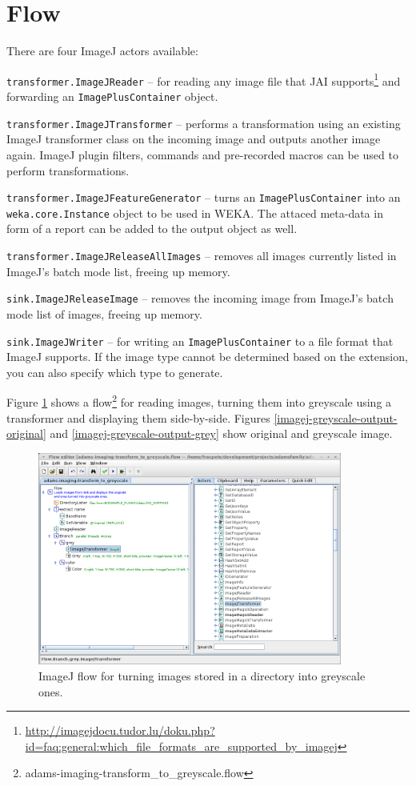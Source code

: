 \documentclass[a4paper]{book}
\begin{document}
\section{Flow}
There are four ImageJ actors available:
\begin{tight_itemize}
	\item \texttt{transformer.ImageJReader} -- for reading any image file that
	JAI supports\footnote{\url{http://imagejdocu.tudor.lu/doku.php?id=faq:general:which_file_formats_are_supported_by_imagej}{}}
	and forwarding an \texttt{ImagePlusContainer} object.
	\item \texttt{transformer.ImageJTransformer} -- performs a transformation
	using an existing ImageJ transformer class on the incoming image and
	outputs another image again. ImageJ plugin filters, commands and pre-recorded
	macros can be used to perform transformations.
	\item \texttt{transformer.ImageJFeatureGenerator} -- turns an
	\texttt{ImagePlusContainer} into an \texttt{weka.core.Instance} object to
	be used in WEKA. The attaced meta-data in form of a report can be added to the
	output object as well.
	\item \texttt{transformer.ImageJReleaseAllImages} -- removes all images
	currently listed in ImageJ's batch mode list, freeing up memory.
	\item \texttt{sink.ImageJReleaseImage} -- removes the incoming image from
	ImageJ's batch mode list of images, freeing up memory.
	\item \texttt{sink.ImageJWriter} -- for writing an \texttt{ImagePlusContainer}
	to a file format that ImageJ supports. If the image type cannot be
	determined based on the extension, you can also specify which type to generate.
\end{tight_itemize}

Figure \ref{imagej-greyscale-flow} shows a
flow\footnote{adams-imaging-transform\_to\_greyscale.flow} for reading images,
turning them into greyscale using a  transformer and displaying them
side-by-side.
Figures \ref{imagej-greyscale-output-original} and
\ref{imagej-greyscale-output-grey} show original and greyscale image.

\begin{figure}[htb]
  \centering
  \includegraphics[width=10.0cm]{images/imagej-greyscale-flow.png}
  \caption{ImageJ flow for turning images stored in a directory into greyscale
  ones.}
  \label{imagej-greyscale-flow}
\end{figure}
\end{document}
